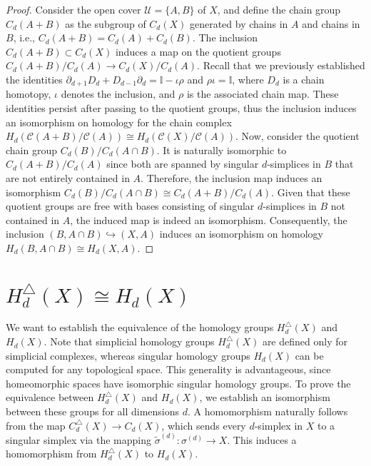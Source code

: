 \begin{proof}
	Consider the open cover \( \mathcal{U} = \{A, B\} \) of \( X \), and define the chain group \( C_d(A + B) \) as the subgroup of \( C_d(X) \) generated by chains in \( A \) and chains in \( B \), i.e., \( C_d(A + B) = C_d(A) + C_d(B) \). The inclusion \( C_d(A + B) \subset C_d(X) \) induces a map on the quotient groups $C_d(A + B)/C_d(A) \to C_d(X)/C_d(A)$. Recall that we previously established the identities $\partial_{d+1} D_d + D_{d-1}\partial_d = \mathbb{I} - \iota\rho$ and $\rho\iota = \mathbb{I}$, where \( D_d \) is a chain homotopy, \( \iota \) denotes the inclusion, and \( \rho \) is the associated chain map. These identities persist after passing to the quotient groups, thus the inclusion induces an isomorphism on homology for the chain complex $H_d(\mathcal{C}(A + B)/\mathcal{C}(A)) \cong H_d(\mathcal{C}(X)/\mathcal{C}(A))$. Now, consider the quotient chain group \( C_d(B)/C_d(A \cap B) \). It is naturally isomorphic to \( C_d(A + B)/C_d(A) \) since both are spanned by singular \( d \)-simplices in \( B \) that are not entirely contained in \( A \). Therefore, the inclusion map induces an isomorphism $C_d(B)/C_d(A \cap B) \cong C_d(A + B)/C_d(A)$. Given that these quotient groups are free with bases consisting of singular \( d \)-simplices in \( B \) not contained in \( A \), the induced map is indeed an isomorphism. Consequently, the inclusion \( (B, A \cap B) \hookrightarrow (X, A) \) induces an isomorphism on homology $H_d(B, A \cap B) \cong H_d(X, A)$.
\end{proof}

\section{$H_{d}^{\triangle}(X) \cong H_{d}(X)$}
\label{HomologicalEquivalence}
We want to establish the equivalence of the homology groups $H^{\triangle}_{d}(X)$ and $H_{d}(X)$. Note that simplicial homology groups $H^{\triangle}_{d}(X)$ are defined only for simplicial complexes, whereas singular homology groups $H_{d}(X)$ can be computed for any topological space. This generality is advantageous, since homeomorphic spaces have isomorphic singular homology groups. To prove the equivalence between $H^{\triangle}_{d}(X)$ and $H_{d}(X)$, we establish an isomorphism between these groups for all dimensions $d$. A homomorphism naturally follows from the map $C^{\triangle}_{d}(X) \rightarrow C_{d}(X)$, which sends every $d$-simplex in $X$ to a singular simplex via the mapping $\tilde{\sigma}^{(d)}: \sigma^{(d)}\rightarrow X$. This induces a homomorphism from $H^{\triangle}_{d}(X)$ to $H_{d}(X)$.

